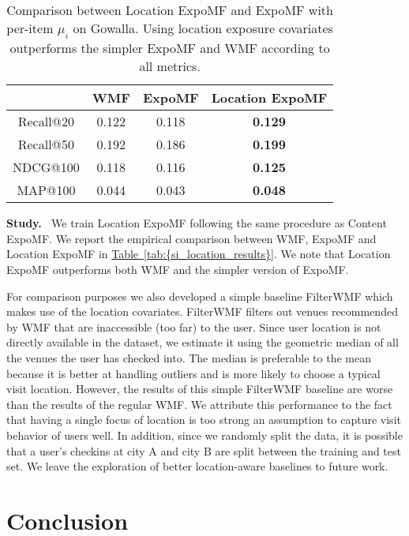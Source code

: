 \documentclass{sig-alternate-arxiv}
\begin{document}
\begin{table}
\centering
\begin{tabular}{c c c c}
\hline
            & WMF & ExpoMF & Location ExpoMF \\ \hline
  Recall@20 & 0.122 & 0.118 & \textbf{0.129} \\
  Recall@50 & 0.192 & 0.186 & \textbf{0.199} \\
  NDCG@100  & 0.118 & 0.116 & \textbf{0.125} \\
  MAP@100   & 0.044 & 0.043 & \textbf{0.048} \\
\hline
\end{tabular}
\caption{Comparison between Location ExpoMF and ExpoMF with per-item
$\mu_i$ on Gowalla. Using location exposure covariates outperforms the
simpler ExpoMF and WMF according to all metrics.}
\label{tab:si_location_results}
\end{table}

{\vspace{0.1in}\noindent \textbf{{Study.} \,}} We train Location ExpoMF following the same procedure as
Content ExpoMF. We report the empirical comparison between WMF, ExpoMF and
Location ExpoMF in {\hyperref[tab:{si_location_results}]{Table~\ref*{tab:{si_location_results}}}}. We note that Location
ExpoMF outperforms both WMF and the simpler version of ExpoMF. 

For comparison purposes we also developed a simple baseline FilterWMF which makes use of the
location covariates. FilterWMF filters out venues recommended by WMF that are inaccessible (too far) to the user. Since user
location is not directly available in the dataset, we estimate it using the
geometric median of all the venues the user has checked into. 
The median is preferable to the mean because it is better at handling outliers and is more likely to choose a typical visit location. 
However, the results of this simple FilterWMF baseline are worse than the results of the
regular WMF. We attribute this performance to the fact that having a single focus of location 
is too strong an assumption to capture visit behavior of users well. 
In addition, since we randomly split the data, it is possible that a user's
checkins at city A and city B are split between the training and test set.
We leave the exploration of better location-aware baselines to future work. 
 
\section{Conclusion}
\end{document}
